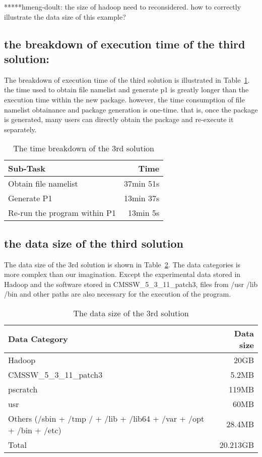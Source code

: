 \documentclass{article}
\begin{document}
*****hmeng-doult: the size of hadoop need to reconsidered. how to correctly illustrate the data size of this example?

\subsection{the breakdown of execution time of the third solution: }
\indent The breakdown of execution time of the third solution is illustrated in Table~\ref{table:time-3rd}. the time used to obtain file namelist and generate p1 is greatly longer than the execution time within the new package. however, the time consumption of file namelist obtainance and package generation is one-time. that is, once the package is generated, many users can directly obtain the package and re-execute it separately.

\begin{table}
    \centering
    \begin{tabular}{|l|r|}
    \hline
    Sub-Task & Time \\ \hline
    Obtain file namelist & 37min 51s \\ \hline
    Generate P1 & 13min 37s \\ \hline
    Re-run the program within P1 & 13min 5s \\ \hline
    \end{tabular}
    \caption{The time breakdown of the 3rd solution}
    \label{table:time-3rd}
\end{table}

\subsection{ the data size of the third solution}
\indent The data size of the 3rd solution is shown in Table~\ref{table:datasize-3rd}. The data categories is more complex than our imagination. Except the experimental data stored in Hadoop and the software stored in CMSSW\_5\_3\_11\_patch3, files from /usr /lib /bin and other paths are also necessary for the execution of the program.

\begin{table}
    \centering
    \begin{tabular}{|l|r|}
    \hline
    Data Category & Data size \\ \hline
    Hadoop & 20GB \\ \hline
    CMSSW\_5\_3\_11\_patch3 & 5.2MB \\ \hline
    pscratch & 119MB \\ \hline
    usr & 60MB \\ \hline
    Others (/sbin + /tmp / + /lib + /lib64 + /var + /opt + /bin + /etc) & 28.4MB \\ \hline
    Total & 20.213GB \\ \hline
    \end{tabular}
    \caption{The data size of the 3rd solution}
    \label{table:datasize-3rd}
\end{table}    
\end{document}
